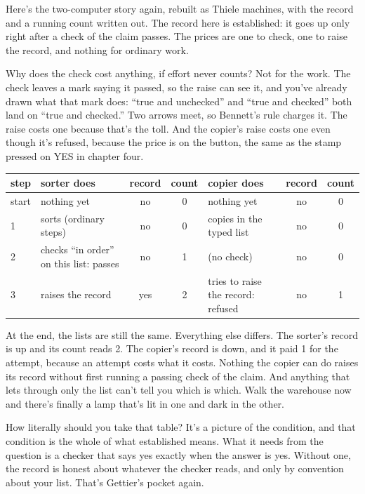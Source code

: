 \documentclass[11pt,twoside]{article}
\theoremstyle{thielethm}
\theoremstyle{thieledef}
\theoremstyle{thieledef}
\theoremstyle{thieledef}
\theoremstyle{thielethm}
\theoremstyle{thieleobs}
\theoremstyle{thielethm}
\begin{document}
Here's the two-computer story again, rebuilt as Thiele machines, with the record and a running count written out. The record here is established: it goes up only right after a check of the claim passes. The prices are one to check, one to raise the record, and nothing for ordinary work.

Why does the check cost anything, if effort never counts? Not for the work. The check leaves a mark saying it passed, so the raise can see it, and you've already drawn what that mark does: ``true and unchecked'' and ``true and checked'' both land on ``true and checked.'' Two arrows meet, so Bennett's rule charges it. The raise costs one because that's the toll. And the copier's raise costs one even though it's refused, because the price is on the button, the same as the stamp pressed on YES in chapter four.

\begin{center}
\small
\begin{tabular}{@{}lp{3.2cm}cc p{3.2cm}cc@{}}
step & sorter does & record & count & copier does & record & count\\ \hline
start & nothing yet & no & 0 & nothing yet & no & 0\\
1 & sorts (ordinary steps) & no & 0 & copies in the typed list & no & 0\\
2 & checks ``in order'' on this list: passes & no & 1 & (no check) & no & 0\\
3 & raises the record & yes & 2 & tries to raise the record: refused & no & 1\\ \hline
\end{tabular}
\end{center}

At the end, the lists are still the same. Everything else differs. The sorter's record is up and its count reads 2. The copier's record is down, and it paid 1 for the attempt, because an attempt costs what it costs. Nothing the copier can do raises its record without first running a passing check of the claim. And anything that lets through only the list can't tell you which is which. Walk the warehouse now and there's finally a lamp that's lit in one and dark in the other.

How literally should you take that table? It's a picture of the condition, and that condition is the whole of what established means. What it needs from the question is a checker that says yes exactly when the answer is yes. Without one, the record is honest about whatever the checker reads, and only by convention about your list. That's Gettier's pocket again.
\end{document}
